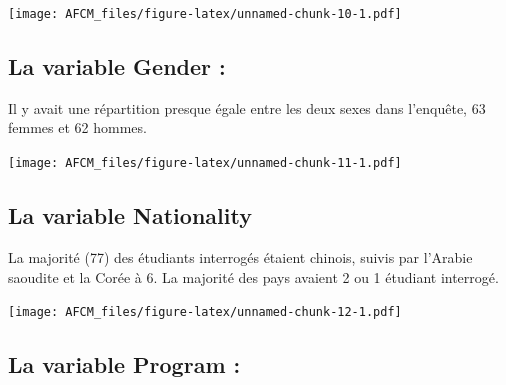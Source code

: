 \documentclass[
]{article}
\newenvironment{Shaded}{\begin{snugshade}}{\end{snugshade}}
\newcommand{\FunctionTok}[1]{\textcolor[rgb]{0.00,0.00,0.00}{#1}}
\newcommand{\NormalTok}[1]{#1}
\newcommand{\SpecialCharTok}[1]{\textcolor[rgb]{0.00,0.00,0.00}{#1}}
\newcommand{\StringTok}[1]{\textcolor[rgb]{0.31,0.60,0.02}{#1}}
\begin{document}
\begin{Shaded}
\end{Shaded}

\texttt{[image: AFCM\_files/figure-latex/unnamed-chunk-10-1.pdf]}

\hypertarget{la-variable-gender}{%
\subsection{La variable Gender :}\label{la-variable-gender}}

Il y avait une répartition presque égale entre les deux sexes dans
l'enquête, 63 femmes et 62 hommes.

\begin{Shaded}
\end{Shaded}

\texttt{[image: AFCM\_files/figure-latex/unnamed-chunk-11-1.pdf]}

\hypertarget{la-variable-nationality}{%
\subsection{La variable Nationality}\label{la-variable-nationality}}

La majorité (77) des étudiants interrogés étaient chinois, suivis par
l'Arabie saoudite et la Corée à 6. La majorité des pays avaient 2 ou 1
étudiant interrogé.

\begin{Shaded}
\end{Shaded}

\texttt{[image: AFCM\_files/figure-latex/unnamed-chunk-12-1.pdf]}

\hypertarget{la-variable-program}{%
\subsection{La variable Program :}\label{la-variable-program}}
\end{document}
